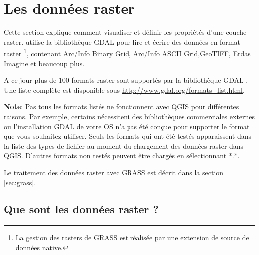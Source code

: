 \chapter{Les données raster}\label{label_raster}



Cette section explique comment visualiser et définir les propriétés d'une couche raster.
\qg utilise la bibliothèque GDAL pour lire et écrire des données en format raster
\footnote{La gestion des rasters de GRASS est réalisée par une extension de source de données native.}, contenant Arc/Info Binary Grid, 
Arc/Info ASCII Grid,GeoTIFF,
Erdas Imagine et beaucoup plus.

A ce jour plus de 100 formats raster sont supportés par la bibliothèque GDAL \cite{GDALweb}.
Une liste complète est disponible sous \url{http://www.gdal.org/formats_list.html}.

\textbf{Note}: Pas tous les formats listés ne fonctionnent avec QGIS pour différentes raisons.
Par exemple, certains nécessitent des bibliothèques commerciales externes ou l'installation GDAL de votre OS n'a pas été conçue pour supporter le format que vous souhaitez utiliser.
Seuls les formats qui ont été testés apparaissent dans la liste des types de fichier au moment
du chargement des données raster dans QGIS. D'autres formats non testés  peuvent être chargés
en sélectionnant *.*.

Le traitement des données raster avec GRASS est décrit dans la section \ref{sec:grass}.

\section{Que sont les données raster ?}\label{label_whatsraster}

